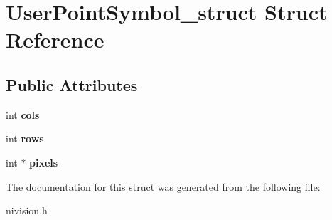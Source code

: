\hypertarget{structUserPointSymbol__struct}{
\section{UserPointSymbol\_\-struct Struct Reference}
\label{structUserPointSymbol__struct}
}
\subsection*{Public Attributes}
\begin{DoxyCompactItemize}
\item 
\hypertarget{structUserPointSymbol__struct_a767fc79eb1304498d344cb752dbd34d8}{
int {\bfseries cols}}
\label{structUserPointSymbol__struct_a767fc79eb1304498d344cb752dbd34d8}

\item 
\hypertarget{structUserPointSymbol__struct_af29d43f9b0e6668e7af0b2c9ec7fb0a3}{
int {\bfseries rows}}
\label{structUserPointSymbol__struct_af29d43f9b0e6668e7af0b2c9ec7fb0a3}

\item 
\hypertarget{structUserPointSymbol__struct_a34701ac936f0a2deba49e1172ac5ee84}{
int $\ast$ {\bfseries pixels}}
\label{structUserPointSymbol__struct_a34701ac936f0a2deba49e1172ac5ee84}

\end{DoxyCompactItemize}


The documentation for this struct was generated from the following file:\begin{DoxyCompactItemize}
\item 
nivision.h\end{DoxyCompactItemize}
